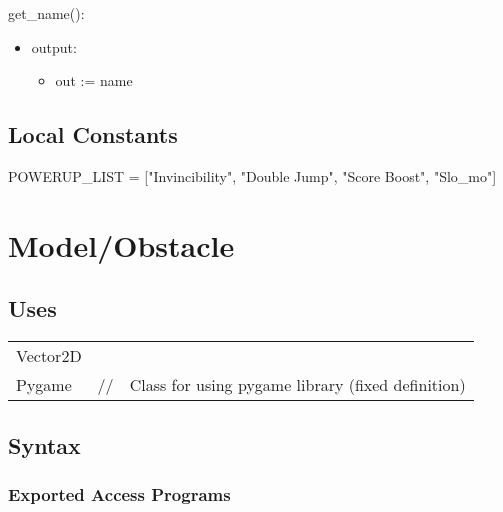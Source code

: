 \documentclass[12pt]{article}
\begin{document}
\noindent get\_name():
\begin{itemize}
    \item output: 
    \begin{itemize}[]
        \item out := name
    \end{itemize}
\end{itemize}

\subsection*{Local Constants}
POWERUP\_LIST = ["Invincibility", "Double Jump", "Score Boost", "Slo\_mo"]
\newpage

\section*{Model/Obstacle}

\subsection* {Uses}

\begin{tabular}{lll}
    Vector2D & &\\
    Pygame & // & Class for using pygame library (fixed definition)\\
\end{tabular}

\subsection* {Syntax}

\subsubsection* {Exported Access Programs}
\end{document}
